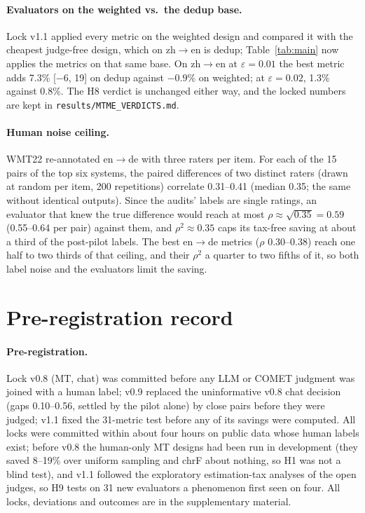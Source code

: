 \documentclass[11pt]{article}
\newcommand{\eps}{\varepsilon}
\begin{document}
\paragraph{Evaluators on the weighted vs.\ the dedup base.} Lock v1.1 applied every metric on the weighted design and
compared it with the cheapest judge-free design, which on zh$\to$en is dedup; Table~\ref{tab:main} now applies the metrics
on that same base. On zh$\to$en at $\eps=0.01$ the best metric adds 7.3\% [$-6$, 19] on dedup against $-0.9\%$ on
weighted; at $\eps=0.02$, 1.3\% against 0.8\%. The H8 verdict is unchanged either way, and the locked numbers are kept in
\texttt{results/MTME\_VERDICTS.md}.

\paragraph{Human noise ceiling.} WMT22 re-annotated en$\to$de with three raters per item. For each of the 15 pairs of the
top six systems, the paired differences of two distinct raters (drawn at random per item, 200 repetitions) correlate
0.31--0.41 (median 0.35; the same without identical outputs). Since the audits' labels are single ratings, an evaluator
that knew the true difference would reach at most $\rho\approx\sqrt{0.35}=0.59$ (0.55--0.64 per pair) against them, and
$\rho^2\approx0.35$ caps its tax-free saving at about a third of the post-pilot labels. The best en$\to$de metrics
($\rho$ 0.30--0.38) reach one half to two thirds of that ceiling, and their $\rho^2$ a quarter to two fifths of it, so
both label noise and the evaluators limit the saving.

\section{Pre-registration record}\label{app:prereg}
\paragraph{Pre-registration.} Lock v0.8 (MT, chat) was committed before any LLM or COMET judgment was joined with a human
label; v0.9 replaced the uninformative v0.8 chat decision (gaps 0.10--0.56, settled by the pilot alone) by close
pairs before they were judged; v1.1 fixed the 31-metric test before any of its savings were computed. All locks were
committed within about four hours on public data whose human labels exist; before v0.8 the human-only MT designs had
been run in development (they saved 8--19\% over uniform sampling and chrF about nothing, so H1 was not a blind test),
and v1.1 followed the exploratory estimation-tax analyses of the open judges, so H9 tests on 31 new evaluators a
phenomenon first seen on four. All locks, deviations and outcomes are in the supplementary material.
\end{document}
